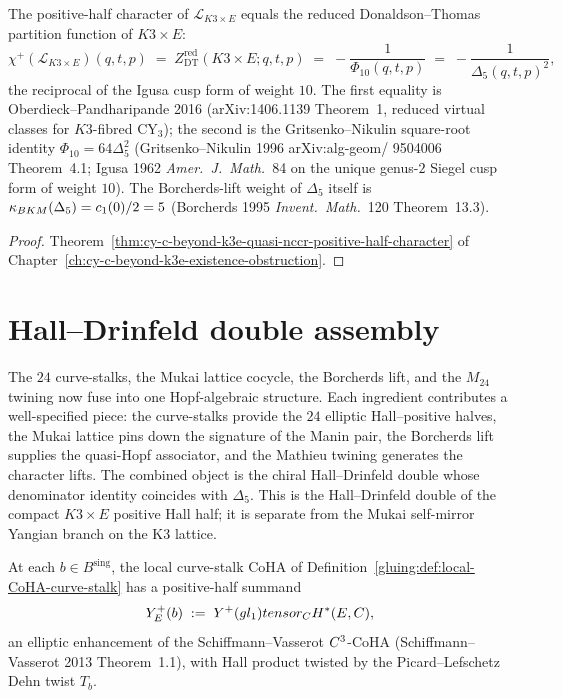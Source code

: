 \begin{theorem}[Positive-half character of the quasi-NCCR is $-1/\Phi_{10} = -\Delta_5^{-2}$]
\label{gluing:thm:quasi-nccr-positive-half-Phi10}
The positive-half character of $\mathscr{L}_{K3 \times E}$ equals the
reduced Donaldson--Thomas partition function of $K3 \times E$:
\[
 \chi^+(\mathscr{L}_{K3 \times E})(q, t, p) \;=\;
 Z^{\mathrm{red}}_{\mathrm{DT}}(K3 \times E; q, t, p) \;=\;
 -\frac{1}{\Phi_{10}(q, t, p)} \;=\; -\frac{1}{\Delta_5(q, t, p)^2},
\]
the reciprocal of the Igusa cusp form of weight $10$. The first
equality is Oberdieck--Pandharipande 2016 (arXiv:1406.1139
Theorem~1, reduced virtual classes for $K3$-fibred CY$_3$); the
second is the Gritsenko--Nikulin square-root identity
$\Phi_{10} = 64 \Delta_5^2$ (Gritsenko--Nikulin 1996 arXiv:alg-geom/
9504006 Theorem~4.1; Igusa 1962 \emph{Amer.\ J.\ Math.}~84
on the unique genus-$2$ Siegel cusp form of weight $10$). The
Borcherds-lift weight of $\Delta_5$ itself is $\kappa_{BKM}(\Delta_5) =
c_1(0)/2 = 5$ (Borcherds 1995 \emph{Invent.\ Math.}~120
Theorem~13.3).
\end{theorem}

\begin{proof}
Theorem~\ref{thm:cy-c-beyond-k3e-quasi-nccr-positive-half-character} of
Chapter~\ref{ch:cy-c-beyond-k3e-existence-obstruction}.
\end{proof}

\section{Hall--Drinfeld double assembly}
\label{gluing:sec:k3xe-hall-drinfeld}

The $24$ curve-stalks, the Mukai lattice cocycle, the Borcherds lift,
and the $M_{24}$ twining now fuse into one Hopf-algebraic structure.
Each ingredient contributes a well-specified piece: the curve-stalks
provide the $24$ elliptic Hall--positive halves, the Mukai lattice
pins down the signature of the Manin pair, the Borcherds lift supplies
the quasi-Hopf associator, and the Mathieu twining generates the
character lifts. The combined object is the chiral Hall--Drinfeld
double whose denominator identity coincides with $\Delta_5$. This is
the Hall--Drinfeld double of the compact $K3 \times E$ positive Hall
half; it is separate from the Mukai self-mirror Yangian branch on the
K3 lattice.

\begin{definition}
\label{gluing:def:elliptic-hall-positive-half}
At each $b \in B^{\mathrm{sing}}$, the local curve-stalk CoHA of
Definition~\ref{gluing:def:local-CoHA-curve-stalk} has a positive-half
summand
\[
 Y^{+}_E(b) \;:=\;
 Y^{+}(gl_1) tensor_{C} H^*(E, C),
\]
an elliptic enhancement of the Schiffmann--Vasserot $C^3$-CoHA
(Schiffmann--Vasserot 2013 Theorem~1.1), with Hall product twisted
by the Picard--Lefschetz Dehn twist $T_b$.
\end{definition}

